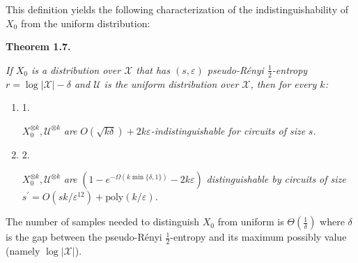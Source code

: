 


This definition yields the following characterization of the indistinguishability of $X_{0}$ from the uniform distribution:\par





\par\medskip\noindent\textbf{
\textbf{Theorem 1.7}\textbf{.}
}\par



\emph{If $X_{0}$ is a distribution over $\mathcal{X}$ that has $(s,\varepsilon)$ pseudo-Rényi $\frac{1}{2}$-entropy $r=\log|\mathcal{X}|-\delta$ and $\mathcal{U}$ is the uniform distribution over $\mathcal{X}$, then for every $k$:}\par


\begin{enumerate}


\item[] 
1. 


$X_{0}^{\otimes k},\mathcal{U}^{\otimes k}$\emph{ are }$O(\sqrt{k\delta})+2k\varepsilon$\emph{-indistinguishable for circuits of size }$s$\emph{.}\par





\item[] 
2. 


$X_{0}^{\otimes k},\mathcal{U}^{\otimes k}$\emph{ are }$(1-e^{-\Omega(k\min\{\delta,1\})}-2k\varepsilon)$\emph{ distinguishable by circuits of size }$s^{\prime}=O(sk/\varepsilon^{12})+\mathrm{poly}(k/\varepsilon)$\emph{.}\par





\end{enumerate}






The number of samples needed to distinguish $X_{0}$ from uniform is $\Theta\left(\frac{1}{\delta}\right)$ where $\delta$ is the gap between the pseudo-Rényi $\frac{1}{2}$-entropy and its maximum possibly value (namely $\log|\mathcal{X}|$).\par




